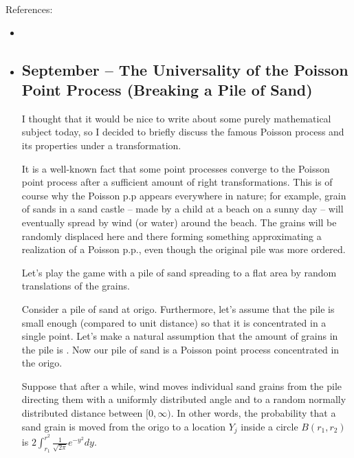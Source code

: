 \documentclass{article}
\begin{document}
References: 
\begin{itemize}
\item {}
\item {}


  \subsection{September – The Universality of the Poisson Point Process (Breaking a Pile of Sand)}


  I thought that it would be nice to write about some purely mathematical subject today, so I decided to briefly discuss the famous Poisson process and its properties under a transformation.

  It is a well-known fact that some point processes converge to the Poisson point process after a sufficient amount of right transformations. This is of course why the Poisson p.p appears everywhere in nature; for example, grain of sands in a sand castle – made by a child at a beach on a sunny day – will eventually spread by wind (or water) around the beach. The grains will be randomly displaced here and there forming something approximating a realization of a Poisson p.p., even though the original pile was more ordered.

  Let's play the game with a pile of sand spreading to a flat area by random translations of the grains. 

  Consider a pile of sand at origo. Furthermore, let's assume that the pile is small enough (compared to unit distance) so that it is concentrated in a single point. Let's make a natural assumption that the amount of grains in the pile is  . Now our pile of sand is a Poisson point process concentrated in the origo.

  Suppose that after a while, wind moves individual sand grains from the pile directing them with a uniformly distributed angle and to a random normally distributed distance between $[0, \infty)$. In other words, the probability that a sand grain is moved from the origo to a location $Y_j$ inside a circle $B(r_1,r_2)$ is $2\int_{r_1}^{r^2} \frac{1}{\sqrt{2 \pi}}e^{-y^2} dy.$ 
  

\end{itemize}
\end{document}
